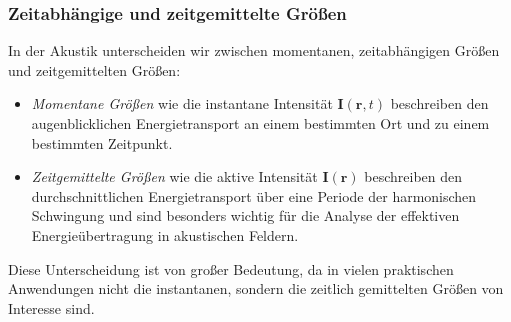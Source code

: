 \subsubsection{Zeitabhängige und zeitgemittelte Größen}

In der Akustik unterscheiden wir zwischen momentanen, zeitabhängigen Größen und zeitgemittelten Größen:

\begin{itemize}
\item \emph{Momentane Größen} wie die instantane Intensität
$\boldsymbol{I}(\boldsymbol{r},t)$ beschreiben den augenblicklichen
Energietransport
an einem bestimmten Ort und zu einem bestimmten Zeitpunkt.
%

\item \emph{Zeitgemittelte Größen} wie die aktive Intensität
$\boldsymbol{I}(\boldsymbol{r})$ beschreiben den durchschnittlichen
Energietransport
über eine Periode der harmonischen Schwingung und sind besonders
wichtig für die Analyse der effektiven Energieübertragung in
akustischen Feldern.
%
\end{itemize}

Diese Unterscheidung ist von großer Bedeutung, da in vielen praktischen Anwendungen nicht die instantanen, sondern die zeitlich gemittelten Größen von Interesse sind.




